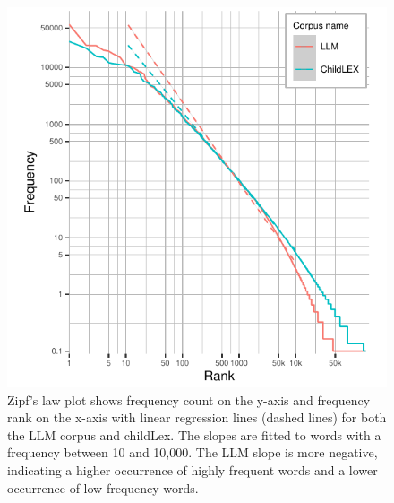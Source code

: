 \documentclass[doc, a4paper, anonymous]{apa7}
\begin{document}
\begin{figure}[!ht]
  \centering
    \includegraphics[width=.7\textwidth]{figures/rankplot-normal-3.5-2.pdf}
    \caption{Zipf's law plot shows frequency count on the y-axis and frequency rank on the x-axis with linear regression lines (dashed lines) for both the LLM corpus and childLex. The slopes are fitted to words with a frequency between 10 and 10,000. The LLM slope is more negative, indicating a higher occurrence of highly frequent words and a lower occurrence of low-frequency words.}
    \label{fig:rankplot-normal}
\end{figure}
\end{document}
